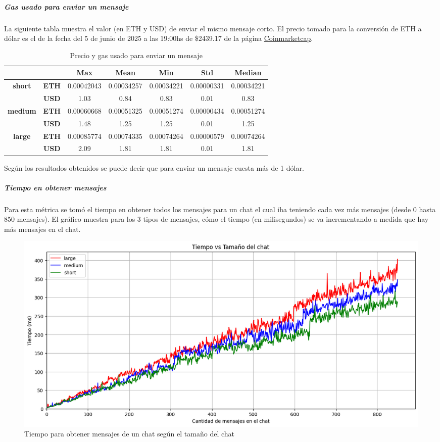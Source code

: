 \subparagraph{Gas usado para enviar un mensaje}

La siguiente tabla muestra el valor (en ETH y USD) de enviar el mismo mensaje corto. El precio tomado para la conversión de ETH a dólar es el de la fecha del 5 de junio de 2025 a las 19:00hs de \$2439.17 de la página \href{https://coinmarketcap.com/currencies/ethereum/}{Coinmarketcap}.

\setlength\tabcolsep{10pt}
\begin{table}[H]
    \centering
    \begin{tabular}{|c|c|c|c|c|c|c|}
    \hline
    & & \textbf{Max} & \textbf{Mean} & \textbf{Min} & \textbf{Std} & \textbf{Median} \\
    \hline
    \multirow{2}{*}{\textbf{short}} & \textbf{ETH} & 0.00042043 & 0.00034257 & 0.00034221 & 0.00000331 & 0.00034221 \\
    \cline{2-7}
    & \textbf{USD} & 1.03 & 0.84 & 0.83 & 0.01 & 0.83 \\
    \hline
    \multirow{2}{*}{\textbf{medium}} & \textbf{ETH} & 0.00060668 & 0.00051325 & 0.00051274 & 0.00000434 & 0.00051274 \\
    \cline{2-7}
    & \textbf{USD} & 1.48 & 1.25 & 1.25 & 0.01 & 1.25 \\
    \hline
    \multirow{2}{*}{\textbf{large}} & \textbf{ETH} & 0.00085774 & 0.00074335 & 0.00074264 & 0.00000579 & 0.00074264 \\
    \cline{2-7}
    & \textbf{USD} & 2.09 & 1.81 & 1.81 & 0.01 & 1.81 \\
    \hline
    \end{tabular}
    \caption{Precio y gas usado para enviar un mensaje}
\end{table}

Según los resultados obtenidos se puede decir que para enviar un mensaje cuesta más de 1 dólar.

\subparagraph{Tiempo en obtener mensajes}

Para esta métrica se tomó el tiempo en obtener todos los mensajes para un chat el cual iba teniendo cada vez más mensajes (desde 0 hasta 850 mensajes). El gráfico muestra para los 3 tipos de mensajes, cómo el tiempo (en milisegundos) se va incrementando a medida que hay más mensajes en el chat.

\begin{figure}[H]
    \centering
    \includegraphics[width=1\linewidth]{img/blockchain-get-message-graphic.png}
    \caption{Tiempo para obtener mensajes de un chat según el tamaño del chat}
    \label{fig:blockchain-get-message-graphic.png}
\end{figure}

